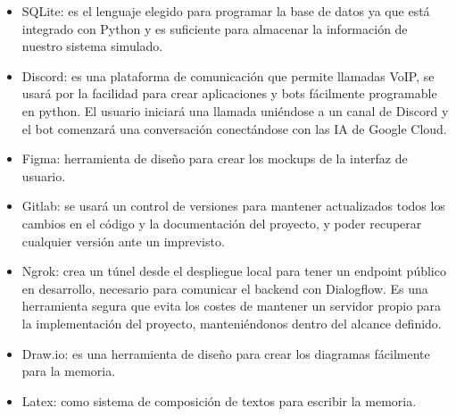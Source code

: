 \documentclass[12pt, a4paper, twoside]{report}
\begin{document}
\begin{itemize}
                \begin{itemize}
                    \item Flask: framework web para crear aplicaciones web. Se utilizará para desarrollar el backend de la aplicación.
                    \item SQLAlchemy: sirve para interactuar con la base de datos SQLite de manera sencilla y eficiente.
                    \item Discord.py: librería para interactuar con Discord y programar el bot que atenderá las llamadas VoIP.
                    \item Google-Cloud-Dialogflow y Google-Cloud-Speech: para interactuar con los servicios de IA de Google Cloud.
                    \item Selenium: para automatizar la simulación de los trámites en las webs oficiales.
                \end{itemize}
            \item SQLite: es el lenguaje elegido para programar la base de datos ya que está integrado con Python y es suficiente para almacenar la información de nuestro sistema simulado. 
            \item Discord: es una plataforma de comunicación que permite llamadas VoIP, se usará por la facilidad para crear aplicaciones y bots fácilmente programable en python.
                El usuario iniciará una llamada uniéndose a un canal de Discord y el bot comenzará una conversación conectándose con las IA de Google Cloud.
            \item Figma: herramienta de diseño para crear los mockups de la interfaz de usuario.
            \item Gitlab: se usará un control de versiones para mantener actualizados todos los cambios en el código y la documentación del proyecto, y poder recuperar cualquier versión ante un imprevisto. 
            \item Ngrok: crea un túnel desde el despliegue local para tener un endpoint público en desarrollo, necesario para comunicar el backend con Dialogflow. 
                Es una herramienta segura que evita los costes de mantener un servidor propio para la implementación del proyecto, manteniéndonos dentro del alcance definido.
            \item Draw.io: es una herramienta de diseño para crear los diagramas fácilmente para la memoria.
            \item Latex: como sistema de composición de textos para escribir la memoria.
            \end{itemize}
\end{document}
